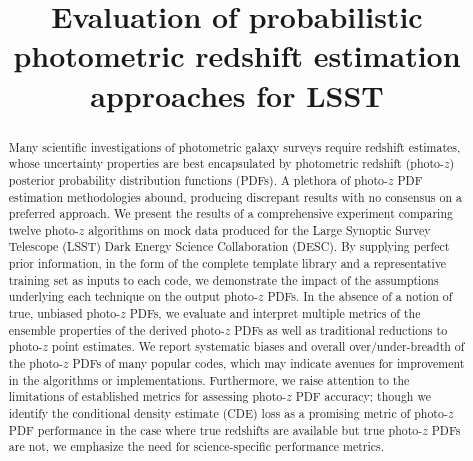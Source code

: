 \documentclass[\docopts]{\docclass}
\begin{document}
\linenumbers

\title{Evaluation of probabilistic photometric redshift estimation approaches for \textsc{LSST}}

\maketitlepre

\begin{abstract}

Many scientific investigations of photometric galaxy surveys require redshift estimates, whose uncertainty properties are best encapsulated by photometric redshift (photo-$z$) posterior probability distribution functions (PDFs).
A plethora of photo-$z$ PDF estimation methodologies abound, producing discrepant results with no consensus on a preferred approach.
We present the results of a comprehensive experiment comparing twelve photo-$z$ algorithms on mock data produced for the Large Synoptic Survey Telescope (\textsc{LSST}) Dark Energy Science Collaboration (\textsc{DESC}).
By supplying perfect prior information, in the form of the complete template library and a representative training set as inputs to each code, we demonstrate the impact of the assumptions underlying each technique on the output photo-$z$ PDFs.
In the absence of a notion of true, unbiased photo-$z$ PDFs, we evaluate and interpret multiple metrics of the ensemble properties of the derived photo-$z$ PDFs as well as traditional reductions to photo-$z$ point estimates.
We report systematic biases and overall over/under-breadth of the photo-$z$ PDFs of many popular codes, which may indicate avenues for improvement in the algorithms or implementations.
Furthermore, we raise attention to the limitations of established metrics for assessing photo-$z$ PDF accuracy; though we identify the conditional density estimate (CDE) loss as a promising metric of photo-$z$ PDF performance in the case where true redshifts are available but true photo-$z$ PDFs are not, we emphasize the need for science-specific performance metrics.

\end{abstract}


\maketitlepost







\end{document}
